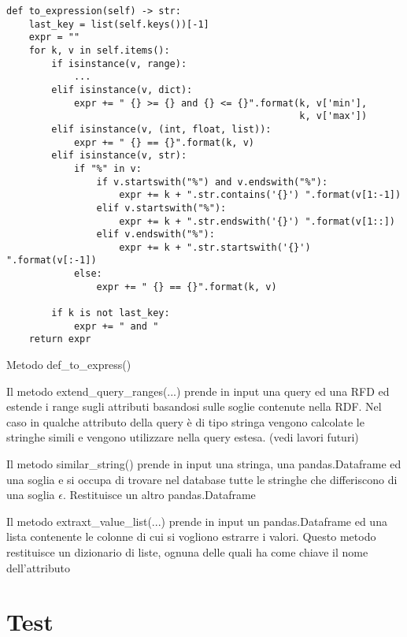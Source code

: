 \begin{listing}[H]
\begin{verbatim}
def to_expression(self) -> str:
    last_key = list(self.keys())[-1]
    expr = ""
    for k, v in self.items():
        if isinstance(v, range):
            ...
        elif isinstance(v, dict):
            expr += " {} >= {} and {} <= {}".format(k, v['min'],
                                                    k, v['max'])
        elif isinstance(v, (int, float, list)):
            expr += " {} == {}".format(k, v)
        elif isinstance(v, str):
            if "%" in v:
                if v.startswith("%") and v.endswith("%"):
                    expr += k + ".str.contains('{}') ".format(v[1:-1])
                elif v.startswith("%"):
                    expr += k + ".str.endswith('{}') ".format(v[1::])
                elif v.endswith("%"):
                    expr += k + ".str.startswith('{}') ".format(v[:-1])
            else:
                expr += " {} == {}".format(k, v)

        if k is not last_key:
            expr += " and "
    return expr
\end{verbatim}
\caption{Metodo def{\_}to{\_}express()}
\label{Code:9}
\end{listing}

Il metodo extend{\_}query{\_}ranges(...) prende in input una query ed una RFD ed estende i range sugli attributi basandosi sulle soglie contenute nella RDF. Nel caso in qualche attributo della query è di tipo stringa vengono calcolate le stringhe simili e vengono utilizzare nella query estesa.
(vedi lavori futuri)


Il metodo similar{\_}string() prende in input una stringa, una pandas.Dataframe ed una soglia e si occupa di trovare nel database tutte le stringhe che differiscono di una soglia $\epsilon$. Restituisce un altro pandas.Dataframe 

Il metodo extraxt{\_}value{\_}list(...) prende in input un pandas.Dataframe ed una lista contenente le colonne di cui si vogliono estrarre i valori. Questo metodo restituisce un dizionario di liste, ognuna delle quali ha come chiave il nome dell'attributo

\section{Test}
